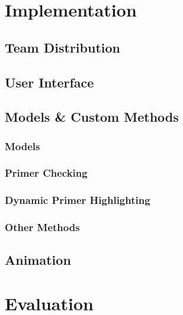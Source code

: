 \documentclass{l3proj}
\begin{document}
\chapter{Implementation}
\label{chap:impl}

\section{Team Distribution}
\label{impl:teamdistribution}


\section{User Interface}
\label{impl:ui}


\section{Models \& Custom Methods}
\label{impl:models}

\subsection{Models}


\subsection{Primer Checking}


\subsection{Dynamic Primer Highlighting}
\label{impl:models:dynHigh}


\subsection{Other Methods}

\section{Animation}
\label{impl:anim}


\chapter{Evaluation}
\label{eval}
\end{document}
